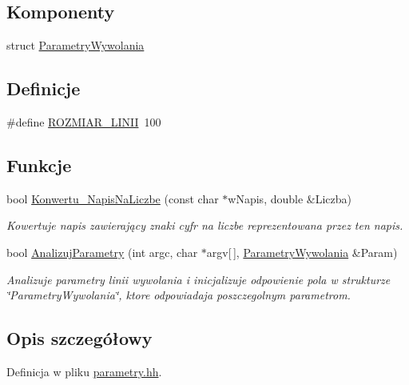 \subsection*{Komponenty}
\begin{DoxyCompactItemize}
\item 
struct \hyperlink{struct_parametry_wywolania}{ParametryWywolania}
\end{DoxyCompactItemize}
\subsection*{Definicje}
\begin{DoxyCompactItemize}
\item 
\#define \hyperlink{parametry_8hh_ac4f92db10fea9b5bd0337dcfa87f1850}{ROZMIAR\_\-LINII}~100
\end{DoxyCompactItemize}
\subsection*{Funkcje}
\begin{DoxyCompactItemize}
\item 
bool \hyperlink{parametry_8hh_a6a3243d05d7fffdaeba9fefd7549285a}{Konwertu\_\-NapisNaLiczbe} (const char $\ast$wNapis, double \&Liczba)
\begin{DoxyCompactList}\small\item\em Kowertuje napis zawierający znaki cyfr na liczbe reprezentowana przez ten napis. \item\end{DoxyCompactList}\item 
bool \hyperlink{parametry_8hh_aedf4a4e7e6152bd7ad1c411cf10cef3d}{AnalizujParametry} (int argc, char $\ast$argv\mbox{[}$\,$\mbox{]}, \hyperlink{struct_parametry_wywolania}{ParametryWywolania} \&Param)
\begin{DoxyCompactList}\small\item\em Analizuje parametry linii wywolania i inicjalizuje odpowienie pola w strukturze \char`\"{}ParametryWywolania\char`\"{}, ktore odpowiadaja poszczegolnym parametrom. \item\end{DoxyCompactList}\end{DoxyCompactItemize}


\subsection{Opis szczegółowy}


Definicja w pliku \hyperlink{parametry_8hh_source}{parametry.hh}.



